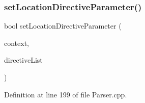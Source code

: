\mbox{\label{classft_1_1_parser_a82bee2278db1afa69bbb6eb6f192743c}} 
\subsubsection{\texorpdfstring{set\+Location\+Directive\+Parameter()}{setLocationDirectiveParameter()}}
{\footnotesize\ttfamily bool set\+Location\+Directive\+Parameter (\begin{DoxyParamCaption}\item[{\hyperlink{classft_1_1_location_block}{Location\+Block} \&}]{context,  }\item[{std\+::vector$<$ \hyperlink{classft_1_1_directive}{Directive} $>$}]{directive\+List }\end{DoxyParamCaption})}



Definition at line 199 of file Parser.\+cpp.



